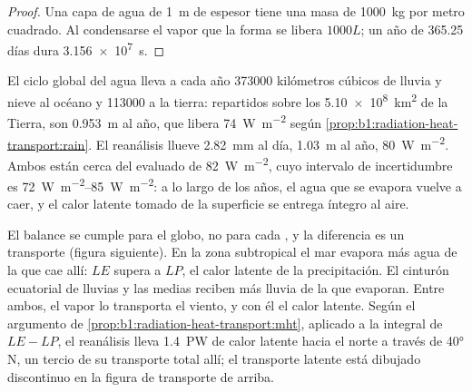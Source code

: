 \begin{proof}
Una capa de agua de \qty{1}{m} de espesor tiene una masa de \qty{1000}{kg} por metro cuadrado. Al condensarse el vapor que la forma se libera $1000L$; un año de \num{365.25} días dura \qty{3.156e7}{s}.
\end{proof}

\begin{example}\label{ex:b1:radiation-heat-transport:rain}
El ciclo global del agua lleva a cada año \num{373000} kilómetros cúbicos de lluvia y nieve al océano y \num{113000} a la tierra: repartidos sobre los
\qty{5.10e8}{km^2} de la Tierra, son \qty{0.953}{m} al año, que libera
\qty{74}{W.m^{-2}} según \cref{prop:b1:radiation-heat-transport:rain}. El reanálisis
llueve \qty{2.82}{mm} al día, \qty{1.03}{m} al año, \qty{80}{W.m^{-2}}. Ambos están cerca
del  evaluado de \qty{82}{W.m^{-2}}, cuyo intervalo de incertidumbre es
\qtyrange{72}{85}{W.m^{-2}}: a lo largo de los años, el agua que se evapora vuelve a caer, y el calor latente tomado de la superficie se entrega íntegro al aire.
\end{example}

El balance se cumple para el globo, no para cada , y la diferencia es un transporte (figura siguiente). En la zona subtropical el mar evapora más agua de la que cae allí: $LE$ supera a $LP$, el calor latente de la precipitación. El cinturón ecuatorial de lluvias y las  medias reciben más lluvia de la que evaporan. Entre ambos, el vapor lo transporta el viento, y con él el calor latente. Según el argumento de \cref{prop:b1:radiation-heat-transport:mht}, aplicado a la integral de $LE - LP$, el reanálisis lleva \qty{1.4}{PW} de calor latente hacia el norte a través de \ang{40} N, un tercio de su transporte total allí; el transporte latente está dibujado discontinuo en la figura de transporte de arriba.


